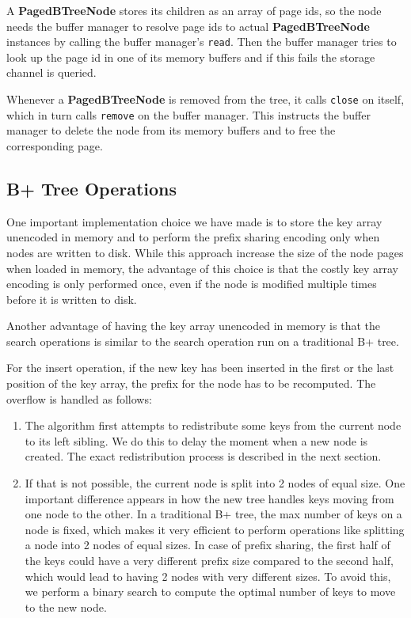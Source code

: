 \documentclass[11pt,a4paper,oneside]{article}
\begin{document}
A \textbf{PagedBTreeNode} stores its children as an array of page ids, 
so the node needs the buffer manager to resolve page ids to actual \textbf{PagedBTreeNode} instances by calling the buffer manager's \texttt{read}.
Then the buffer manager tries to look up the page id in one of its memory buffers and if this fails the storage channel is queried.

Whenever a \textbf{PagedBTreeNode} is removed from the tree, it calls \texttt{close} on itself, which in turn calls \texttt{remove} on the buffer manager.
This instructs the buffer manager to delete the node from its memory buffers and to free the corresponding page.

\subsection{B+ Tree Operations} %
\label{sub:b_tree_operations}
One important implementation choice we have made is to store the key array unencoded in memory and to perform the prefix sharing encoding only when nodes are written to disk. While this approach increase the size of the node pages when loaded in memory, the advantage of this choice is that the costly key array encoding is only performed once, even if the node is modified multiple times before it is written to disk. 

Another advantage of having the key array unencoded in memory is that the search operations is similar to the search operation run on a traditional B+ tree. 

For the insert operation, if the new key has been inserted in the first or the last position of the key array, the prefix for the node has to be recomputed. The overflow is handled as follows:
\begin{enumerate}
	\item The algorithm first attempts to redistribute some keys from the current node to its left sibling. We do this to delay the moment when a new node is created. The exact redistribution process is described in the next section.
	\item If that is not possible, the current node is split into 2 nodes of equal size. One important difference appears in how the new tree handles keys moving from one node to the other. In a traditional B+ tree, the max number of keys on a node is fixed, which makes it very efficient to perform operations like splitting a node into 2 nodes of equal sizes. In case of prefix sharing, the first half of the keys could have a very different prefix size compared to the second half, which would lead to having 2 nodes with very different sizes. To avoid this, we perform a binary search to compute the optimal number of keys to move to the new node.
\end{enumerate}
	
\end{document}
